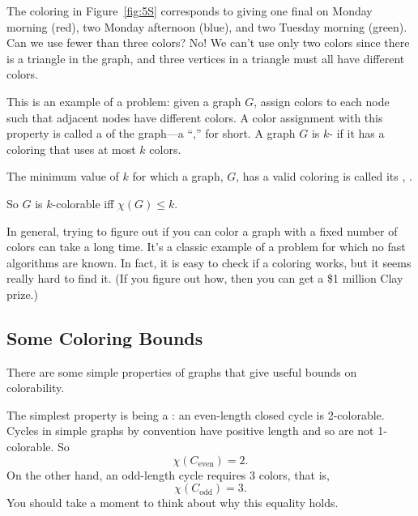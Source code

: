The coloring in Figure~\ref{fig:5S} corresponds to giving one final on
Monday morning (red), two Monday afternoon (blue), and two Tuesday
morning (green).  Can we use fewer than three colors?  No! We can't
use only two colors since there is a triangle in the graph, and three
vertices in a triangle must all have different colors.

This is an example of a  problem:
 given a graph $G$, assign colors to each
node such that adjacent nodes have different colors.  A color assignment
with this property is called a   of the graph---a ``,'' for short.  A graph $G$
is $k$- if it has a coloring that uses at most $k$ colors.
\begin{definition}
  The minimum value of $k$ for which a graph, $G$, has a valid coloring is
  called its , .
\end{definition}
So $G$ is $k$-colorable iff $\chi(G) \leq k$.

In general, trying to figure out if you can color a graph with a fixed
number of colors can take a long time.  It's a classic example of a
problem for which no fast algorithms are known.  In fact, it is easy to
check if a coloring works, but it seems really hard to find it. (If you
figure out how, then you can get a \$1 million Clay prize.)


\subsection{Some Coloring Bounds}

There are some simple properties of graphs that give useful bounds on
colorability. 

The simplest property is being a : an even-length closed
cycle is 2-colorable.  Cycles in simple graphs by convention have
positive length and so are not 1-colorable.  So
\[
\chi(C_{\text{even}}) = 2.
\]
On the other hand, an odd-length cycle requires 3 colors, that is,
\begin{equation}\label{Codd3}
\chi(C_{\text{odd}}) = 3.
\end{equation}
You should take a moment to think about why this equality holds.


